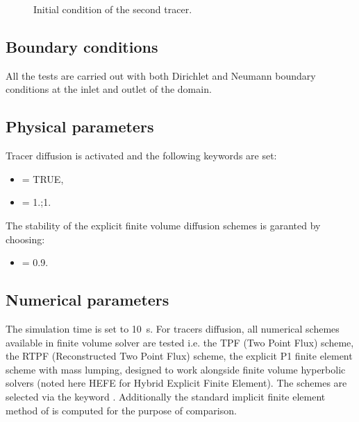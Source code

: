 \begin{figure}[h!]
\centering
{}
\caption{Initial condition of the second tracer.}
\label{t2d:tracerdiffusion:mesh}
\end{figure}

\subsection{Boundary conditions}

All the tests are carried out with both Dirichlet and Neumann boundary
conditions at the inlet and outlet of the domain.

\subsection{Physical parameters}

Tracer diffusion is activated and the following keywords are set:
\begin{itemize}
\item{} = TRUE,
\item{} = 1.;1.
\end{itemize}
The stability of the explicit finite volume diffusion schemes is garanted by
choosing:
\begin{itemize}
\item{} = 0.9.
\end{itemize}

\subsection{Numerical parameters}

The simulation time is set to 10~s.
For tracers diffusion, all numerical schemes available in  finite
volume solver are tested
i.e. the TPF (Two Point Flux) scheme, the RTPF (Reconstructed Two Point Flux)
scheme,
the explicit P1
finite element scheme with mass lumping, designed to work alongside finite
volume hyperbolic solvers (noted here HEFE for Hybrid Explicit Finite Element).
The schemes are selected via the keyword
.
Additionally the standard implicit finite element method of  is
computed for the purpose of comparison.

